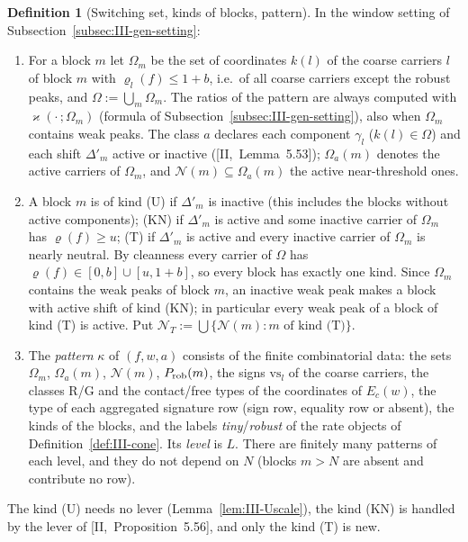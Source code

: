 \documentclass[10pt]{amsart}
\theoremstyle{definition}
\newtheorem{definition}[theorem]{Definition}
\theoremstyle{remark}
\begin{document}
\begin{definition}[Switching set, kinds of blocks, pattern]\label{def:III-pattern}
In the window setting of Subsection~\textup{\ref{subsec:III-gen-setting}}:
\begin{enumerate}
\item[(a)] For a block $m$ let $\Omega_m$ be the set of coordinates $k(l)$ of
the coarse carriers $l$ of block $m$ with $\varrho_l(f)\le1+b$, i.e.\ of all
coarse carriers except the robust peaks, and $\Omega:=\bigcup_m\Omega_m$.  The
ratios of the pattern are always computed with $\varkappa(\cdot\,;\Omega_m)$
(formula of Subsection~\ref{subsec:III-gen-setting}), also when $\Omega_m$
contains weak peaks.  The class $a$ declares each component $\gamma_l$
($k(l)\in\Omega$) and each shift $\Delta'_m$ active or inactive
([II,~Lemma~5.53]); $\Omega_a(m)$ denotes the active carriers of $\Omega_m$,
and $\mathcal N(m)\subseteq\Omega_a(m)$ the active near-threshold ones.
\item[(b)] A block $m$ is of kind
 \textup{(U)} if $\Delta'_m$ is inactive (this includes the blocks without
 active components);
 \textup{(KN)} if $\Delta'_m$ is active and some inactive carrier of $\Omega_m$
 has $\varrho(f)\ge u$;
 \textup{(T)} if $\Delta'_m$ is active and every inactive carrier of $\Omega_m$ is
 nearly neutral.
By cleanness every carrier of $\Omega$ has $\varrho(f)\in[0,b]\cup[u,1+b]$, so
every block has exactly one kind.  Since $\Omega_m$ contains the weak peaks
of block $m$, an inactive weak peak makes a block with active shift of kind
(KN); in particular every weak peak of a block of kind (T) is active.  Put $\mathcal N_T:=\bigcup\{\mathcal N(m):
m\text{ of kind (T)}\}$.
\item[(c)] The \emph{pattern} $\kappa$ of $(f,w,a)$ consists of the finite
combinatorial data: the sets $\Omega_m$, $\Omega_a(m)$, $\mathcal N(m)$,
$P_{\rm rob}(m)$, the signs $\mathrm{vs}_l$ of the coarse carriers, the classes
R/G and the contact/free types of the coordinates of $E_c(w)$, the type of
each aggregated signature row (sign row, equality row or absent), the kinds
of the blocks, and the labels \emph{tiny}/\emph{robust} of the rate objects of
Definition~\ref{def:III-cone}.  Its \emph{level} is $L$.  There are finitely
many patterns of each level, and they do not depend on $N$ (blocks $m>N$
are absent and contribute no row).
\end{enumerate}
\end{definition}

The kind (U) needs no lever (Lemma~\ref{lem:III-Uscale}), the kind (KN) is
handled by the lever of [II,~Proposition~5.56], and only the kind (T) is new.
\end{document}
